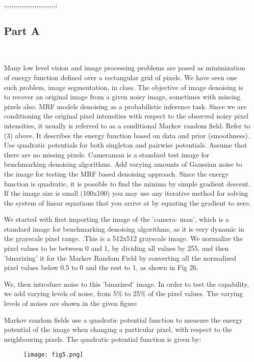 ,,,,,,,,,,,,,,,,,,,,,,,,,,,;\documentclass[conference]{IEEEtran}
\begin{document}
\subsection{Part A}
\\
\par Many low level vision and image processing problems are
posed as minimization of energy function defined over a
rectangular grid of pixels. We have seen one such problem,
image segmentation, in class. The objective of image denoising
is to recover an original image from a given noisy image,
sometimes with missing pixels also. MRF models denoising
as a probabilistic inference task. Since we are conditioning the
original pixel intensities with respect to the observed noisy
pixel intensities, it usually is referred to as a conditional
Markov random field. Refer to (3) above. It describes the
energy function based on data and prior (smoothness). Use
quadratic potentials for both singleton and pairwise potentials.
Assume that there are no missing pixels. Cameraman is a
standard test image for benchmarking denoising algorithms.
Add varying amounts of Gaussian noise to the image for
testing the MRF based denoising approach. Since the energy
function is quadratic, it is possible to find the minima by
simple gradient descent. If the image size is small (100x100)
you may use any iterative method for solving the system of
linear equations that you arrive at by equating the gradient to
zero.
\par  We started with first importing the image of the 'camera-
man', which is a standard image for benchmarking denoising
algorithms, as it is very dynamic in the grayscale pixel range.
\cite{b14}.This is a 512x512 grayscale image. We normalize the pixel
values to be between 0 and 1, by dividing all values by 255,
and then 'binarizing' it for the Markov Random Field by
converting all the normalized pixel values below 0.5 to 0 and
the rest to 1, as shown in Fig 26.
\par We, then introduce noise to this 'binarized' image. In order
to test the capability, we add varying levels of noise, from 5\%
to 25\% of the pixel values.
The varying levels of noises are shown in the given figure
\par Markov random fields use a quadratic potential function to
measure the energy potential of the image when changing a
particular pixel, with respect to the neighbouring pixels.
The quadratic potential function is given by:
\\
\begin{figure}[htbp]
\centerline{\texttt{[image: fig5.png]}}
\end{figure}
\end{document}
